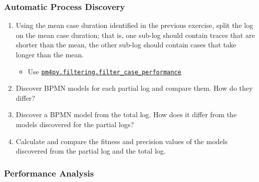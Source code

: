 \begin{withcode}
\begin{exerciseboxcomputer}

\subsubsection*{Automatic Process Discovery}

\begin{enumerate}
    \item Using the mean case duration identified in the previous exercise, split the log on the mean case duration; that is, one sub-log should contain traces that are shorter than the mean, the other sub-log should contain cases that take longer than the mean.
    \begin{itemize}
       \item Use \href{https://processintelligence.solutions/static/api/2.7.11/generated/pm4py.filtering.filter_case_performance.html}{\texttt{pm4py.filtering.filter\_case\_performance}}
    \end{itemize}
    \item Discover BPMN models for each partial log and compare them. How do they differ?
    \item Discover a BPMN model from the total log. How does it differ from the models discovered for the partial logs?
    \item Calculate and compare the fitness and precision values of the models discovered from the partial log and the total log.
\end{enumerate}
\end{exerciseboxcomputer}

\begin{exerciseboxcomputer}

\subsubsection*{Performance Analysis}


\end{exerciseboxcomputer}
\end{withcode}
